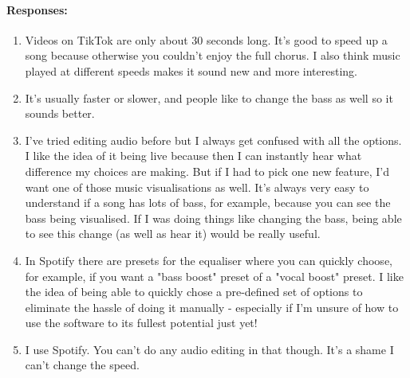 {{\begin{minipage}{15cm}
		\paragraph{Responses:}
		\begin{enumerate}
			\item Videos on TikTok are only about 30 seconds long. It's good to speed up a song because otherwise you couldn't enjoy the full chorus. I also think music played at different speeds makes it sound new and more interesting.
			\item It's usually faster or slower, and people like to change the bass as well so it sounds better.
			\item I've tried editing audio before but I always get confused with all the options. I like the idea of it being live because then I can instantly hear what difference my choices are making. But if I had to pick one new feature, I'd want one of those music visualisations as well. It's always very easy to understand if a song has lots of bass, for example, because you can see the bass being visualised. If I was doing things like changing the bass, being able to see this change (as well as hear it) would be really useful.
			\item In Spotify there are presets for the equaliser where you can quickly choose, for example, if you want a "bass boost" preset of a "vocal boost" preset. I like the idea of being able to quickly chose a pre-defined set of options to eliminate the hassle of doing it manually - especially if I'm unsure of how to use the software to its fullest potential just yet!
			\item I use Spotify. You can't do any audio editing in that though. It's a shame I can't change the speed.
		\end{enumerate}
		\bigskip \bigskip \bigskip
\end{minipage}}
}

\pagebreak
